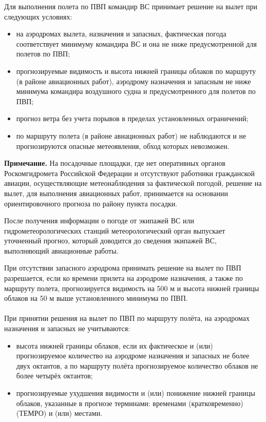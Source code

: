 Для выполнения полета по ПВП командир ВС принимает решение на вылет при следующих условиях:
\begin{itemize}
    \item на аэродромах вылета, назначения и запасных, фактическая погода соответствует минимуму командира ВС и она не ниже предусмотренной для полетов по ПВП;
    \item прогнозируемые видимость и высота нижней границы облаков по маршруту (в районе авиационных работ), аэродрому назначения и запасным не ниже минимума командира воздушного судна и предусмотренного для полетов по ПВП;
    \item прогноз ветра без учета порывов в пределах установленных ограничений;
    \item по маршруту полета (в районе авиационных работ) не наблюдаются и не прогнозируются опасные метеоявления, обход которых невозможен.
\end{itemize}

\textbf{Примечание.} На посадочные площадки, где нет оперативных органов Роскомгидромета Российской Федерации и отсутствуют работники гражданской авиации, осуществляющие метеонаблюдения за фактической погодой, решение на вылет, для выполнения авиационных работ, принимается на основании ориентировочного прогноза по району пункта посадки.

После получения информации о погоде от экипажей ВС или гидрометеорологических станций метеорологический орган выпускает уточненный прогноз, который доводится до сведения экипажей ВС, выполняющий авиационные работы.

При отсутствии запасного аэродрома принимать решение на вылет по ПВП разрешается, если ко времени прилета на аэродроме назначения, а также по маршруту полета, прогнозируется видимость на 500 м и высота нижней границы облаков на 50 м выше установленного минимума по ПВП.

\paragraph{} При принятии решения на вылет по ПВП по маршруту полёта, на аэродромах назначения и запасных не учитываются:
\begin{itemize}
    \item высота нижней границы облаков, если их фактическое и (или) прогнозируемое количество на аэродроме назначения и запасных не более двух октантов, а по маршруту полёта прогнозируемое количество облаков не более четырёх октантов;
    \item прогнозируемые ухудшения видимости и (или) понижение нижней границы облаков, указанные в прогнозе терминами: временами (кратковременно) (ТЕМРО) и (или) местами.
\end{itemize}
	
